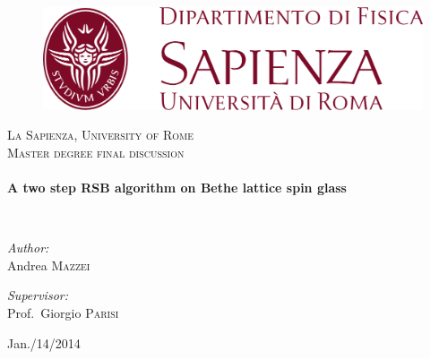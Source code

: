\begin{titlepage}
\begin{center}

\begin{figure}

\centerline{\includegraphics{img/dip-logo-uff.png}}
\end{figure}

\textsc{\LARGE La Sapienza, University of Rome}\\[1.5cm]

\textsc{\Large Master degree final discussion}\\[0.5cm]

\HRule \\[0.4cm]
{ \huge \bfseries A two step RSB algorithm on Bethe lattice spin glass\\[0.4cm] }

\HRule \\[1.5cm]

\begin{minipage}{0.4\textwidth}
\begin{flushleft} \large
\emph{Author:}\\
Andrea \textsc{Mazzei}
\end{flushleft}
\end{minipage}
\begin{minipage}{0.4\textwidth}
\begin{flushright} \large
\emph{Supervisor:} \\
Prof.~Giorgio \textsc{Parisi}
\end{flushright}

\end{minipage}


\vspace{10 cm}
\date{\large \today}
Jan./14/2014
\vfill

\end{center}
\end{titlepage} 